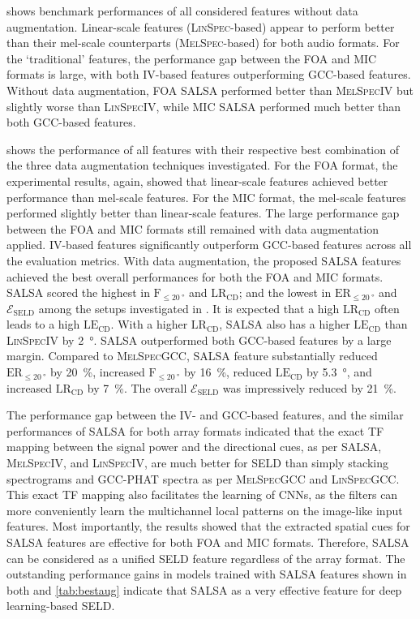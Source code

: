 \documentclass[journal]{IEEEtran}
\newcommand{\ER}{$\text{ER}_{\le \SI{20}{\degree}}$\xspace}
\newcommand{\Fone}{$\text{F}_{\le \SI{20}{\degree}}$\xspace}
\newcommand{\LE}{$\text{LE}_\text{CD}$\xspace}
\newcommand{\LR}{$\text{LR}_\text{CD}$\xspace}
\newcommand{\Eseld}{$\mathcal{E}_\text{SELD}$\xspace}
\begin{document}
 shows benchmark performances of all considered features without data augmentation. Linear-scale features (\textsc{LinSpec}-based) appear to perform better than their mel-scale counterparts (\textsc{MelSpec}-based) for both audio formats. 
For the `traditional' features, the performance gap between the FOA and MIC formats is large, with both IV-based features outperforming GCC-based features. Without data augmentation, FOA SALSA performed better than \textsc{MelSpecIV} but slightly worse than \textsc{LinSpecIV}, while MIC SALSA performed much better than both GCC-based features. 

 shows the performance of all features with their respective best combination of the three data augmentation techniques investigated. For the FOA format, the experimental results, again, showed that linear-scale features achieved better performance than mel-scale features. For the MIC format, the mel-scale features performed slightly better than linear-scale features. The large performance gap between the FOA and MIC formats still remained with data augmentation applied. IV-based features significantly outperform GCC-based features across all the evaluation metrics. With data augmentation, the proposed SALSA features achieved the best overall performances for both the FOA and MIC formats. SALSA scored the highest in \Fone and \LR; and the lowest in \ER and \Eseld among the setups investigated in \protect{}. It is expected that a high \LR often leads to a high \LE. With a higher \LR, SALSA also has a higher \LE than \textsc{LinSpecIV} by \SI{2}{\degree}. SALSA outperformed both GCC-based features by a large margin. Compared to \textsc{MelSpecGCC}, SALSA feature substantially reduced \ER by \SI{20}{\percent}, increased \Fone by \SI{16}{\percent}, reduced \LE by \SI{5.3}{\degree}, and increased \LR by \SI{7}{\percent}. The overall \Eseld was impressively reduced by \SI{21}{\percent}. 

The performance gap between the IV- and GCC-based features, and the similar performances of SALSA for both array formats indicated that the exact TF mapping between the signal power and the directional cues, as per SALSA, \textsc{MelSpecIV}, and \textsc{LinSpecIV}, are much better for SELD than simply stacking spectrograms and GCC-PHAT spectra as per \textsc{MelSpecGCC} and \textsc{LinSpecGCC}. This exact TF mapping also facilitates the learning of CNNs, as the filters can more conveniently learn the multichannel local patterns on the image-like input features. Most importantly, the results showed that the extracted spatial cues for SALSA features are effective for both FOA and MIC formats. 
Therefore, SALSA can be considered as a unified SELD feature regardless of the array format. The outstanding performance gains in models trained with SALSA features shown in both  and \ref{tab:bestaug} indicate that SALSA as a very effective feature for deep learning-based SELD. 
\end{document}
